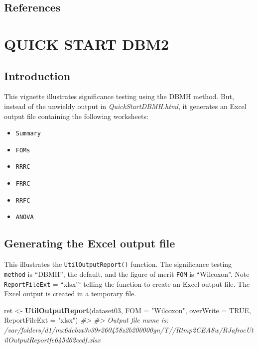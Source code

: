 \documentclass[]{book}
\newenvironment{Shaded}{\begin{snugshade}}{\end{snugshade}}
\newcommand{\CommentTok}[1]{\textcolor[rgb]{0.56,0.35,0.01}{\textit{#1}}}
\newcommand{\DataTypeTok}[1]{\textcolor[rgb]{0.13,0.29,0.53}{#1}}
\newcommand{\KeywordTok}[1]{\textcolor[rgb]{0.13,0.29,0.53}{\textbf{#1}}}
\newcommand{\NormalTok}[1]{#1}
\newcommand{\OtherTok}[1]{\textcolor[rgb]{0.56,0.35,0.01}{#1}}
\newcommand{\StringTok}[1]{\textcolor[rgb]{0.31,0.60,0.02}{#1}}
\providecommand{\tightlist}{%
  \setlength{\itemsep}{0pt}\setlength{\parskip}{0pt}}
\begin{document}
\hypertarget{references-5}{%
\section{References}\label{references-5}}

\hypertarget{QuickStartDBM2}{%
\chapter{QUICK START DBM2}\label{QuickStartDBM2}}

\hypertarget{introduction-5}{%
\section{Introduction}\label{introduction-5}}

This vignette illustrates significance testing using the DBMH method. But, instead of the unwieldy output in \emph{QuickStartDBMH.html}, it generates an Excel output file containing the following worksheets:

\begin{itemize}
\tightlist
\item
  \texttt{Summary}
\item
  \texttt{FOMs}
\item
  \texttt{RRRC}
\item
  \texttt{FRRC}
\item
  \texttt{RRFC}
\item
  \texttt{ANOVA}
\end{itemize}

\hypertarget{generating-the-excel-output-file}{%
\section{Generating the Excel output file}\label{generating-the-excel-output-file}}

This illustrates the \texttt{UtilOutputReport()} function. The significance testing \texttt{method} is ``DBMH'', the default, and the figure of merit \texttt{FOM} is ``Wilcoxon''. Note \texttt{ReportFileExt} = ``xlsx''` telling
the function to create an Excel output file. The Excel output is created in a temporary file.

\begin{Shaded}
\begin{Highlighting}[]
\NormalTok{ret <-}\StringTok{ }\KeywordTok{UtilOutputReport}\NormalTok{(dataset03, }\DataTypeTok{FOM =} \StringTok{"Wilcoxon"}\NormalTok{, }\DataTypeTok{overWrite =} \OtherTok{TRUE}\NormalTok{, }\DataTypeTok{ReportFileExt =} \StringTok{"xlsx"}\NormalTok{)}
\CommentTok{#> }
\CommentTok{#> Output file name is:      /var/folders/d1/mx6dcbzx3v39r260458z2b200000gn/T//Rtmp2CEA8w/RJafrocUtilOutputReportfe645d62cedf.xlsx}
\end{Highlighting}
\end{Shaded}
\end{document}
